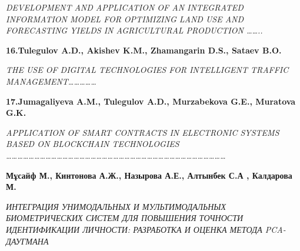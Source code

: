 \emph{DEVELOPMENT AND APPLICATION OF AN INTEGRATED INFORMATION MODEL FOR
OPTIMIZING LAND USE AND FORECASTING YIELDS IN AGRICULTURAL PRODUCTION
\ldots\ldots..}

\textbf{16.Tulegulov A.D., Akishev K.M., Zhamangarin D.S., Sataev B.O.}

\emph{THE USE OF DIGITAL TECHNOLOGIES FOR INTELLIGENT TRAFFIC
MANAGEMENT\ldots\ldots\ldots\ldots\ldots{}}

\textbf{17.Jumagaliyeva A.M., Tulegulov A.D., Murzabekova G.E., Muratova
G.K.}

\emph{APPLICATION OF SMART CONTRACTS IN ELECTRONIC SYSTEMS BASED ON
BLOCKCHAIN TECHNOLOGIES
\ldots\ldots\ldots\ldots\ldots\ldots\ldots\ldots\ldots\ldots\ldots\ldots\ldots\ldots\ldots\ldots\ldots\ldots\ldots\ldots\ldots\ldots\ldots\ldots\ldots\ldots\ldots\ldots\ldots\ldots\ldots\ldots\ldots\ldots\ldots\ldots\ldots\ldots\ldots{}}

\textbf{Мұсайф М., Кинтонова А.Ж., Назырова А.Е., Алтынбек С.А ,
Калдарова М.}

\emph{ИНТЕГРАЦИЯ УНИМОДАЛЬНЫХ И МУЛЬТИМОДАЛЬНЫХ БИОМЕТРИЧЕСКИХ СИСТЕМ
ДЛЯ ПОВЫШЕНИЯ ТОЧНОСТИ ИДЕНТИФИКАЦИИ ЛИЧНОСТИ: РАЗРАБОТКА И ОЦЕНКА
МЕТОДА PCA-ДАУГМАНА}

